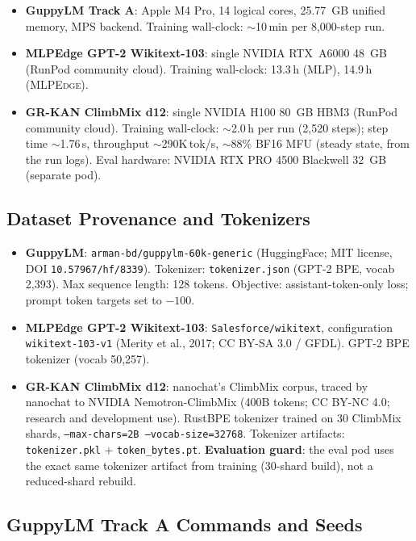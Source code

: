 \documentclass{article}
\newcommand{\mlpedge}{\textsc{MLPEdge}}
\begin{document}
\begin{itemize}
  \item \textbf{GuppyLM Track A}: Apple M4 Pro, 14 logical cores, 25.77~GB unified memory, MPS backend.
    Training wall-clock: $\sim$10\,min per 8,000-step run.
  \item \textbf{MLPEdge GPT-2 Wikitext-103}: single NVIDIA RTX~A6000 48~GB (RunPod community cloud).
    Training wall-clock: 13.3\,h (MLP), 14.9\,h (\mlpedge{}).
  \item \textbf{GR-KAN ClimbMix d12}: single NVIDIA H100 80~GB HBM3 (RunPod community cloud).
    Training wall-clock: $\sim$2.0\,h per run (2,520 steps); step time
    $\sim$1.76\,s, throughput $\sim$290K\,tok/s, $\sim$88\% BF16 MFU
    (steady state, from the run logs).
    Eval hardware: NVIDIA RTX PRO 4500 Blackwell 32~GB (separate pod).
\end{itemize}

\subsection{Dataset Provenance and Tokenizers}

\begin{itemize}
  \item \textbf{GuppyLM}: \texttt{arman-bd/guppylm-60k-generic} (HuggingFace;
    MIT license, DOI \texttt{10.57967/hf/8339}).
    Tokenizer: \texttt{tokenizer.json} (GPT-2 BPE, vocab 2,393).
    Max sequence length: 128 tokens.
    Objective: assistant-token-only loss; prompt token targets set to $-100$.
  \item \textbf{MLPEdge GPT-2 Wikitext-103}: \texttt{Salesforce/wikitext},
    configuration \texttt{wikitext-103-v1} (Merity et al., 2017;
    CC BY-SA 3.0 / GFDL).
    GPT-2 BPE tokenizer (vocab 50,257).
  \item \textbf{GR-KAN ClimbMix d12}: nanochat's ClimbMix corpus, traced by
    nanochat to NVIDIA Nemotron-ClimbMix (400B tokens; CC BY-NC 4.0;
    research and development use).
    RustBPE tokenizer trained on 30 ClimbMix shards,
    \texttt{--max-chars=2B --vocab-size=32768}.
    Tokenizer artifacts: \texttt{tokenizer.pkl} + \texttt{token\_bytes.pt}.
    \textbf{Evaluation guard}: the eval pod uses the exact same tokenizer artifact
    from training (30-shard build), not a reduced-shard rebuild.
\end{itemize}

\subsection{GuppyLM Track A Commands and Seeds}
\end{document}
